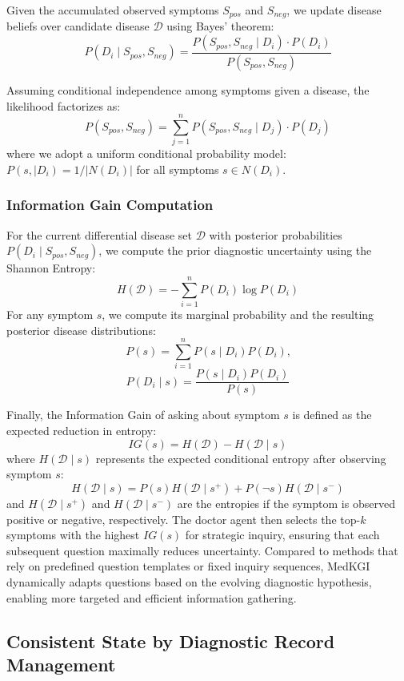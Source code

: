 \documentclass[11pt]{article}
\newcommand{\tool}{MedKGI{\xspace}}
\newcommand{\Doctor}{doctor agent\xspace}
\begin{document}
Given the accumulated observed symptoms $S_{pos}$ and $S_{neg}$, we update disease beliefs over candidate disease $\mathcal{D}$ using Bayes' theorem:
$$P(D_i \mid S_{pos}, S_{neg}) = \frac{P(S_{pos}, S_{neg} \mid D_i) \cdot P(D_i)}{P(S_{pos}, S_{neg})}$$

Assuming conditional independence among symptoms given a disease, the likelihood factorizes as:
$$P(S_{pos}, S_{neg})=\sum_{j=1}^{n} P(S_{pos}, S_{neg} \mid D_j) \cdot P(D_j)$$ 
where we adopt a uniform conditional probability model: $P(s, \mid D_i)=1 / \left | N(D_i) \right |$ for all symptoms $s \in N(D_i)$.


\subsubsection{Information Gain Computation}

For the current differential disease set $\mathcal{D}$ with posterior probabilities $P(D_i \mid S_{pos}, S_{neg})$, we compute the prior diagnostic uncertainty using the Shannon Entropy:  
$$ H(\mathcal{D})=-\sum^{n}_{i=1}P(D_i)\log{P(D_i)} $$
For any symptom $s$, we compute its marginal probability and the resulting posterior disease distributions: 
$$P(s)=\sum^{n}_{i=1}P(s \mid D_i)P(D_i) \text{,} $$
$$P(D_i \mid s)=\frac{P(s \mid D_i)P(D_i)}{P(s)}$$

Finally, the Information Gain of asking about symptom $s$ is defined as the expected reduction in entropy: 
$$ IG(s)=H(\mathcal{D})-H(\mathcal{D} \mid s) $$ 
where $H(\mathcal{D} \mid s)$ represents the expected conditional entropy after observing symptom $s$:
$$ H(\mathcal{D} \mid s) = P(s)H(\mathcal{D} \mid s^+) + P(\neg s)H(\mathcal{D} \mid s^-) $$ 
and $H(\mathcal{D} \mid s^+)$ and $H(\mathcal{D} \mid s^-)$ are the entropies if the symptom is observed positive or negative, respectively.
The \Doctor then selects the top-$k$ symptoms with the highest $IG(s)$ for strategic inquiry, ensuring that each subsequent question maximally reduces uncertainty.
Compared to methods that rely on predefined question templates or fixed inquiry sequences, \tool{} dynamically adapts questions based on the evolving diagnostic hypothesis, enabling more targeted and efficient information gathering.

\subsection{Consistent State by Diagnostic Record Management}
\label{record}
\end{document}
